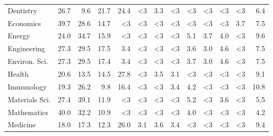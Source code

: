 \begin{tabular}{lrrrrrrrrrrrr}
Dentistry         &         26.7 &               9.6 &           21.7 &            24.4 &                 <3 &               3.3 &                   <3 &                     <3 &                  <3 &             <3 &          <3 &    6.4 \\
Economics         &         39.7 &              28.6 &           14.7 &              <3 &                 <3 &                <3 &                   <3 &                     <3 &                  <3 &             <3 &         3.7 &    7.5 \\
Energy            &         24.0 &              34.7 &           15.9 &              <3 &                 <3 &                <3 &                   <3 &                    5.1 &                 3.7 &            4.0 &          <3 &    9.6 \\
Engineering       &         27.3 &              29.5 &           17.5 &             3.4 &                 <3 &                <3 &                   <3 &                    3.6 &                 3.0 &            4.6 &          <3 &    7.5 \\
Environ. Sci.     &         27.3 &              29.5 &           17.4 &             3.4 &                 <3 &                <3 &                   <3 &                    3.7 &                 3.0 &            4.6 &          <3 &    7.5 \\
Health            &         20.6 &              13.5 &           14.5 &            27.8 &                 <3 &               3.5 &                  3.1 &                     <3 &                  <3 &             <3 &          <3 &    9.1 \\
Immunology        &         19.3 &              26.2 &            9.8 &            16.4 &                 <3 &                <3 &                  3.4 &                    4.2 &                  <3 &             <3 &          <3 &   10.8 \\
Materials Sci.    &         27.4 &              39.1 &           11.9 &              <3 &                 <3 &                <3 &                   <3 &                    5.2 &                  <3 &            3.6 &          <3 &    5.5 \\
Mathematics       &         40.0 &              32.2 &           10.9 &              <3 &                 <3 &                <3 &                   <3 &                    4.0 &                  <3 &             <3 &          <3 &    4.2 \\
Medicine          &         18.0 &              17.3 &           12.3 &            26.0 &                3.1 &               3.6 &                  3.4 &                     <3 &                  <3 &             <3 &          <3 &    9.4 \\

\end{tabular}
